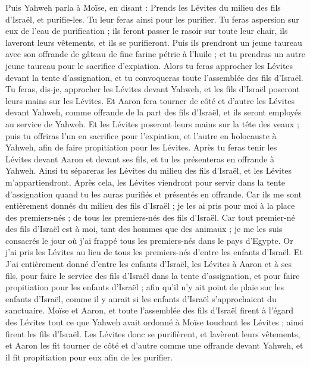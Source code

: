 \begin{multicols}{2}
Puis Yahweh parla à Moïse, en disant :
Prends les Lévites du milieu des fils d'Israël, et purifie-les.
 Tu leur feras ainsi pour les purifier. Tu feras aspersion sur eux de l'eau de purification ; ils feront passer le rasoir sur toute leur chair, ils laveront leurs vêtements, et ils se purifieront.
Puis ils prendront un jeune taureau avec son offrande de gâteau de fine farine pétrie à l'huile ; et tu prendras un autre jeune taureau pour le sacrifice d'expiation.
Alors tu feras approcher les Lévites devant la tente d'assignation, et tu convoqueras toute l'assemblée des fils d'Israël.
Tu feras, dis-je, approcher les Lévites devant Yahweh, et les fils d'Israël poseront leurs mains sur les Lévites.
Et Aaron fera tourner de côté et d'autre les Lévites devant Yahweh, comme offrande de la part des fils d'Israël, et ils seront employés au service de Yahweh.
Et les Lévites poseront leurs mains sur la tête des veaux ; puis tu offriras l'un en sacrifice pour l'expiation, et l'autre en holocauste à Yahweh, afin de faire propitiation pour les Lévites.
Après tu feras tenir les Lévites devant Aaron et devant ses fils, et tu les présenteras en offrande à Yahweh.
Ainsi tu sépareras les Lévites du milieu des fils d'Israël, et les Lévites m'appartiendront.
Après cela, les Lévites viendront pour servir dans la tente d'assignation quand tu les auras purifiés et présentés en offrande.
Car ils me sont entièrement donnés du milieu des fils d'Israël ; je les ai pris pour moi à la place des premiers-nés ; de tous les premiers-nés des fils d'Israël.
Car tout premier-né des fils d'Israël est à moi, tant des hommes que des animaux ; je me les suis consacrés le jour où j'ai frappé tous les premiers-nés dans le pays d'Egypte.
Or j'ai pris les Lévites au lieu de tous les premiers-nés d'entre les enfants d'Israël.
Et J'ai entièrement donné d'entre les enfants d'Israël, les Lévites à Aaron et à ses fils, pour faire le service des fils d'Israël dans la tente d'assignation, et pour faire propitiation pour les enfants d'Israël ; afin qu'il n'y ait point de plaie sur les enfants d'Israël, comme il y aurait si les enfants d'Israël s'approchaient du sanctuaire.
Moïse et Aaron, et toute l'assemblée des fils d'Israël firent à l'égard des Lévites tout ce que Yahweh avait ordonné à Moïse touchant les Lévites ; ainsi firent les fils d'Israël.
Les Lévites donc se purifièrent, et lavèrent leurs vêtements, et Aaron les fit tourner de côté et d'autre comme une offrande devant Yahweh, et il fit propitiation pour eux afin de les purifier.

\end{multicols}
